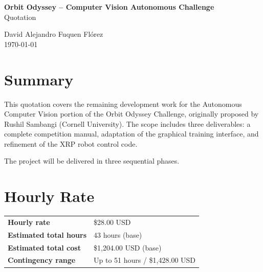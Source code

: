 \documentclass[a4paper]{article}
\begin{document}
\thispagestyle{fancy}

\begin{center}
    \textbf{\large Orbit Odyssey -- Computer Vision Autonomous Challenge} \\[0.3em]
    {\Large Quotation}

    \vspace{1em}

    David Alejandro Fuquen Fl\'orez \\[0.3em]
    {\small \today}
\end{center}

\vspace{1em}

\section*{Summary}

This quotation covers the remaining development work for the Autonomous Computer Vision portion of the Orbit Odyssey Challenge, originally proposed by Rushil Sambangi (Cornell University). The scope includes three deliverables: a complete competition manual, adaptation of the graphical training interface, and refinement of the XRP robot control code.

The project will be delivered in three sequential phases.

\section*{Hourly Rate}

\begin{center}
\begin{tabular}{ll}
\toprule
\textbf{Hourly rate} & \$28.00 USD \\
\textbf{Estimated total hours} & 43 hours (base) \\
\textbf{Estimated total cost} & \$1,204.00 USD (base) \\
\textbf{Contingency range} & Up to 51 hours / \$1,428.00 USD \\
\bottomrule
\end{tabular}
\end{center}
\end{document}
